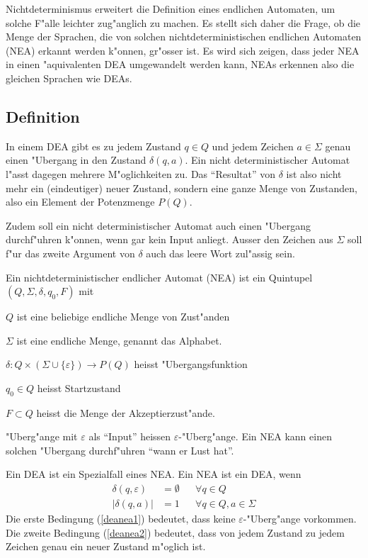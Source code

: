 Nichtdeterminismus erweitert 
die Definition eines endlichen Automaten, um solche F"alle leichter 
zug"anglich zu machen. Es stellt sich daher die Frage, ob die Menge 
der Sprachen, die von solchen nichtdeterministischen endlichen Automaten (NEA)
erkannt werden k"onnen,
gr"osser ist. Es wird sich zeigen, dass jeder NEA
in einen "aquivalenten DEA umgewandelt werden kann, NEAs erkennen also
die gleichen Sprachen wie DEAs.

\subsection{Definition}
In einem DEA gibt es zu jedem Zustand $q\in Q$
und jedem Zeichen $a\in\Sigma$ genau
einen "Ubergang in den Zustand $\delta(q,a)$.
Ein nicht deterministischer
Automat l"asst dagegen mehrere M"oglichkeiten zu. Das ``Resultat''
von $\delta$ ist also nicht mehr ein (eindeutiger) neuer Zustand, sondern
eine ganze Menge von Zustanden, also ein Element der Potenzmenge $P(Q)$.

Zudem soll ein
nicht deterministischer Automat auch einen "Ubergang durchf"uhren
k"onnen, wenn gar kein Input anliegt.
Ausser den Zeichen aus $\Sigma$ soll f"ur das zweite Argument
von $\delta$ auch das leere Wort zul"assig sein.

\begin{definition}\label{definition_nea}
Ein nichtdeterministischer endlicher Automat (NEA) ist ein Quintupel
$(Q,\Sigma,\delta, q_0,F)$ mit
\begin{compactenum}
\item $Q$ ist eine beliebige endliche Menge von Zust"anden
\item $\Sigma$ ist eine endliche Menge, genannt das Alphabet.
\item $\delta\colon Q\times(\Sigma\cup\{\varepsilon\})\to P(Q)$ heisst "Ubergangsfunktion
\item $q_0\in Q$ heisst Startzustand
\item $F\subset Q$ heisst die Menge der Akzeptierzust"ande.
\end{compactenum}
\end{definition}
"Uberg"ange mit $\varepsilon$ als ``Input'' heissen $\varepsilon$-"Uberg"ange.
Ein NEA kann einen solchen "Ubergang durchf"uhren ``wann er Lust hat''.

Ein DEA ist ein Spezialfall eines NEA. Ein NEA ist
ein DEA, wenn
\begin{align}
\delta(q,\varepsilon)&=\emptyset&&\forall q\in Q\label{deanea1}\\
|\delta(q,a)|&=1&&\forall q\in Q, a\in\Sigma\label{deanea2}
\end{align}
Die erste Bedingung (\ref{deanea1}) bedeutet, dass keine
$\varepsilon$-"Uberg"ange vorkommen. Die zweite Bedingung (\ref{deanea2})
bedeutet, dass von jedem Zustand zu jedem Zeichen genau ein
neuer Zustand m"oglich ist.

